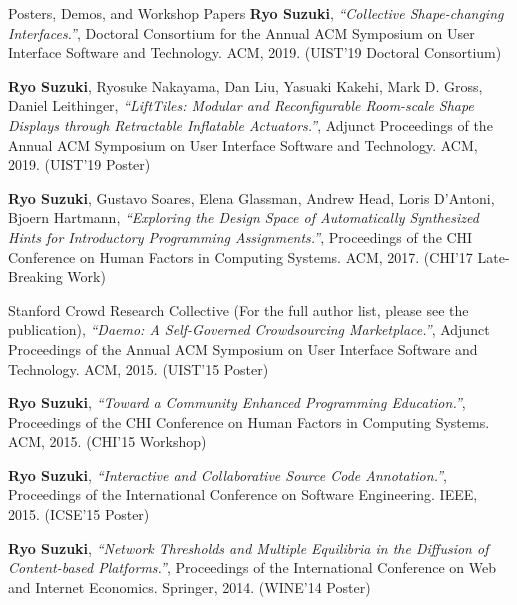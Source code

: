 \documentclass{resume} %
\begin{document}
\begin{rSection}{Posters, Demos, and Workshop Papers}
{\bf Ryo Suzuki},
{\it ``Collective Shape-changing Interfaces.''},
Doctoral Consortium for the Annual ACM Symposium on User Interface Software and Technology. ACM, 2019. (UIST'19 Doctoral Consortium)

{\bf Ryo Suzuki}, Ryosuke Nakayama, Dan Liu, Yasuaki Kakehi, Mark D. Gross, Daniel Leithinger,
{\it ``LiftTiles: Modular and Reconfigurable Room-scale Shape Displays through Retractable Inflatable Actuators.''},
Adjunct Proceedings of the Annual ACM Symposium on User Interface Software and Technology. ACM, 2019. (UIST'19 Poster)

{\bf Ryo Suzuki}, Gustavo Soares, Elena Glassman, Andrew Head, Loris D’Antoni, Bjoern Hartmann,
{\it ``Exploring the Design Space of Automatically Synthesized Hints for Introductory Programming Assignments.''},
Proceedings of the CHI Conference on Human Factors in Computing Systems. ACM, 2017. (CHI'17 Late-Breaking Work)

Stanford Crowd Research Collective (For the full author list, please see the publication),
{\it ``Daemo: A Self-Governed Crowdsourcing Marketplace.''},
Adjunct Proceedings of the Annual ACM Symposium on User Interface Software and Technology. ACM, 2015. (UIST'15 Poster)

{\bf Ryo Suzuki},
{\it ``Toward a Community Enhanced Programming Education.''},
Proceedings of the CHI Conference on Human Factors in Computing Systems. ACM, 2015. (CHI'15 Workshop)

{\bf Ryo Suzuki},
{\it ``Interactive and Collaborative Source Code Annotation.''},
Proceedings of the International Conference on Software Engineering. IEEE, 2015. (ICSE'15 Poster)

{\bf Ryo Suzuki},
{\it ``Network Thresholds and Multiple Equilibria in the Diffusion of Content-based Platforms.''},
Proceedings of the International Conference on Web and Internet Economics. Springer, 2014. (WINE'14 Poster)


\end{rSection}
\end{document}
